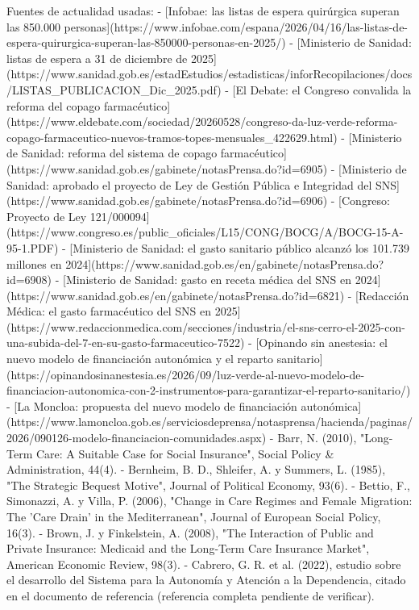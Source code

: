 \documentclass[10pt,a4paper]{article}
\begin{document}
Fuentes de actualidad usadas:
- [Infobae: las listas de espera quirúrgica superan las 850.000 personas](https://www.infobae.com/espana/2026/04/16/las-listas-de-espera-quirurgica-superan-las-850000-personas-en-2025/)
- [Ministerio de Sanidad: listas de espera a 31 de diciembre de 2025](https://www.sanidad.gob.es/estadEstudios/estadisticas/inforRecopilaciones/docs/LISTAS_PUBLICACION_Dic_2025.pdf)
- [El Debate: el Congreso convalida la reforma del copago farmacéutico](https://www.eldebate.com/sociedad/20260528/congreso-da-luz-verde-reforma-copago-farmaceutico-nuevos-tramos-topes-mensuales_422629.html)
- [Ministerio de Sanidad: reforma del sistema de copago farmacéutico](https://www.sanidad.gob.es/gabinete/notasPrensa.do?id=6905)
- [Ministerio de Sanidad: aprobado el proyecto de Ley de Gestión Pública e Integridad del SNS](https://www.sanidad.gob.es/gabinete/notasPrensa.do?id=6906)
- [Congreso: Proyecto de Ley 121/000094](https://www.congreso.es/public_oficiales/L15/CONG/BOCG/A/BOCG-15-A-95-1.PDF)
- [Ministerio de Sanidad: el gasto sanitario público alcanzó los 101.739 millones en 2024](https://www.sanidad.gob.es/en/gabinete/notasPrensa.do?id=6908)
- [Ministerio de Sanidad: gasto en receta médica del SNS en 2024](https://www.sanidad.gob.es/en/gabinete/notasPrensa.do?id=6821)
- [Redacción Médica: el gasto farmacéutico del SNS en 2025](https://www.redaccionmedica.com/secciones/industria/el-sns-cerro-el-2025-con-una-subida-del-7-en-su-gasto-farmaceutico-7522)
- [Opinando sin anestesia: el nuevo modelo de financiación autonómica y el reparto sanitario](https://opinandosinanestesia.es/2026/09/luz-verde-al-nuevo-modelo-de-financiacion-autonomica-con-2-instrumentos-para-garantizar-el-reparto-sanitario/)
- [La Moncloa: propuesta del nuevo modelo de financiación autonómica](https://www.lamoncloa.gob.es/serviciosdeprensa/notasprensa/hacienda/paginas/2026/090126-modelo-financiacion-comunidades.aspx)
- Barr, N. (2010), "Long-Term Care: A Suitable Case for Social Insurance", Social Policy & Administration, 44(4).
- Bernheim, B. D., Shleifer, A. y Summers, L. (1985), "The Strategic Bequest Motive", Journal of Political Economy, 93(6).
- Bettio, F., Simonazzi, A. y Villa, P. (2006), "Change in Care Regimes and Female Migration: The 'Care Drain' in the Mediterranean", Journal of European Social Policy, 16(3).
- Brown, J. y Finkelstein, A. (2008), "The Interaction of Public and Private Insurance: Medicaid and the Long-Term Care Insurance Market", American Economic Review, 98(3).
- Cabrero, G. R. et al. (2022), estudio sobre el desarrollo del Sistema para la Autonomía y Atención a la Dependencia, citado en el documento de referencia (referencia completa pendiente de verificar).
\end{document}

